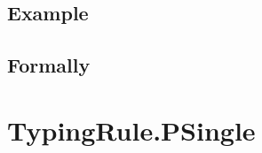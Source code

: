 \documentclass{book}
\begin{document}
\begin{itemize}
  \subsection{Example}



\begin{emptyformal}
    \subsection{Formally}
\end{emptyformal}


\section{TypingRule.PSingle \label{sec:TypingRule.PSingle}}


\end{itemize}
\end{document}
